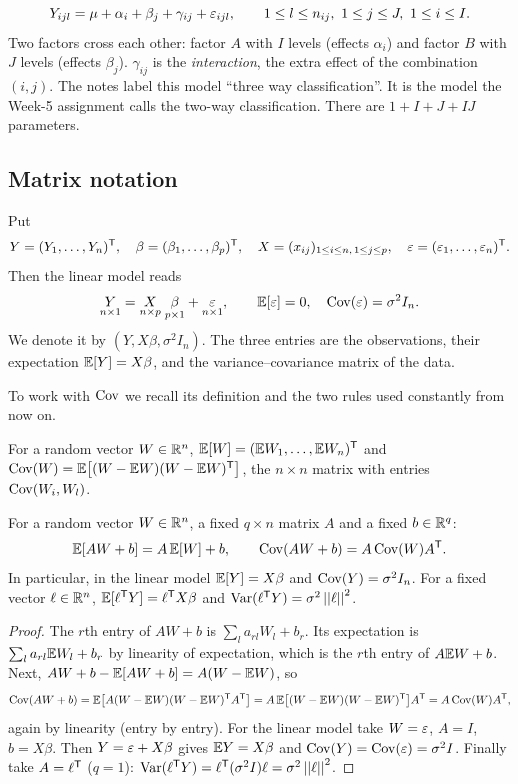 \begin{example}\label{ex:L09-twoway}
\[
Y_{ijl}=\mu+\alpha_i+\beta_j+\gamma_{ij}+\varepsilon_{ijl},\qquad 1\le l\le n_{ij},\ 1\le j\le J,\ 1\le i\le I .
\]
Two factors cross each other: factor $A$ with $I$ levels (effects $\alpha_i$) and factor $B$ with
$J$ levels (effects $\beta_j$). $\gamma_{ij}$ is the \emph{interaction}, the extra effect of the
combination $(i,j)$. The notes label this model ``three way classification''. It is the model
the Week-5 assignment calls the two-way classification. There are $1+I+J+IJ$ parameters.
\end{example}

\subsection{Matrix notation}
\begin{definition}\label{def:L09-matrix}
Put
\[
Y=(Y_1,\dots,Y_n)^{\mathsf T},\quad \beta=(\beta_1,\dots,\beta_p)^{\mathsf T},\quad X=(x_{ij})_{1\le i\le n,\,1\le j\le p},\quad \varepsilon=(\varepsilon_1,\dots,\varepsilon_n)^{\mathsf T} .
\]
Then the linear model reads
\[
\underset{n\times1}{Y}=\underset{n\times p}{X}\;\underset{p\times1}{\beta}+\underset{n\times1}{\varepsilon},
\qquad \mathbb E[\varepsilon]=0,\quad \operatorname{Cov}(\varepsilon)=\sigma^2I_n .
\]
We denote it by $(Y,X\beta,\sigma^2I_n)$. The three entries are the observations, their
expectation $\mathbb E[Y]=X\beta$, and the variance--covariance matrix of the data.
\end{definition}

To work with $\operatorname{Cov}$ we recall its definition and the two rules used constantly from now on.
\begin{definition}\label{def:L09-cov}
For a random vector $W\in\mathbb R^n$, $\mathbb E[W]=(\mathbb E W_1,\dots,\mathbb E W_n)^{\mathsf T}$ and
$\operatorname{Cov}(W)=\mathbb E\bigl[(W-\mathbb E W)(W-\mathbb E W)^{\mathsf T}\bigr]$, the $n\times n$ matrix with entries $\operatorname{Cov}(W_i,W_l)$.
\end{definition}

\begin{proposition}\label{prop:L09-rules}
For a random vector $W\in\mathbb R^n$, a fixed $q\times n$ matrix $A$ and a fixed $b\in\mathbb R^q$:
\[
\mathbb E[AW+b]=A\,\mathbb E[W]+b,\qquad \operatorname{Cov}(AW+b)=A\operatorname{Cov}(W)A^{\mathsf T} .
\]
In particular, in the linear model $\mathbb E[Y]=X\beta$ and $\operatorname{Cov}(Y)=\sigma^2I_n$.
For a fixed vector $\ell\in\mathbb R^n$, $\mathbb E[\ell^{\mathsf T} Y]=\ell^{\mathsf T} X\beta$ and $\operatorname{Var}(\ell^{\mathsf T} Y)=\sigma^2\left|\left|\ell\right|\right|^2$.
\end{proposition}
\begin{proof}
The $r$th entry of $AW+b$ is $\sum_l a_{rl}W_l+b_r$. Its expectation is $\sum_l a_{rl}\mathbb E W_l+b_r$
by linearity of expectation, which is the $r$th entry of $A\mathbb E W+b$. Next,
$AW+b-\mathbb E[AW+b]=A(W-\mathbb E W)$, so
\[
\operatorname{Cov}(AW+b)=\mathbb E\bigl[A(W-\mathbb E W)(W-\mathbb E W)^{\mathsf T} A^{\mathsf T}\bigr]=A\,\mathbb E\bigl[(W-\mathbb E W)(W-\mathbb E W)^{\mathsf T}\bigr]A^{\mathsf T}=A\operatorname{Cov}(W)A^{\mathsf T} ,
\]
again by linearity (entry by entry). For the linear model take $W=\varepsilon$, $A=I$, $b=X\beta$. Then
$Y=\varepsilon+X\beta$ gives $\mathbb E Y=X\beta$ and $\operatorname{Cov}(Y)=\operatorname{Cov}(\varepsilon)=\sigma^2I$. Finally take $A=\ell^{\mathsf T}$ ($q=1$):
$\operatorname{Var}(\ell^{\mathsf T} Y)=\ell^{\mathsf T}(\sigma^2I)\ell=\sigma^2\left|\left|\ell\right|\right|^2$.
\end{proof}

